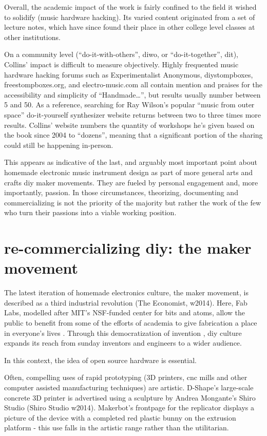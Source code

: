 \begin{itemize}
	Overall, the academic impact of the work is fairly confined to the field it wished to solidify (music hardware hacking). Its varied content originated from a set of lecture notes, which have since found their place in other college level classes at other institutions. 

On a community level (“do-it-with-others”, diwo, or “do-it-together”, dit), Collins’ impact is difficult to measure objectively. Highly frequented music hardware hacking forums such as Experimentalist Anonymous, diystompboxes, freestompboxes.org, and electro-music.com all contain mention and praises for the accessibility and simplicity of “Handmade…”, but results usually number between 5 and 50. As a reference, searching for Ray Wilson’s popular “music from outer space” do-it-yourself synthesizer website returns between two to three times more results. Collins’ website numbers the quantity of workshops he’s given based on the book since 2004 to “dozens”, meaning that a significant portion of the sharing could still be happening in-person.  

This appears as indicative of the last, and arguably most important point about homemade electronic music instrument design as part of more general arts and crafts \/ diy \/ maker movements. They are fueled by personal engagement and, more importantly, passion. In those circumstances, theorizing, documenting and commercializing is not the priority of the majority but rather the work of the few who turn their passions into a viable working position. 

\section{re-commercializing diy: the maker movement}  

The latest iteration of homemade electronics culture, the maker movement, is described as a third industrial revolution (The Economist, w2014). Here, Fab Labs, modelled after MIT’s NSF-funded center for bits and atoms, allow the public to benefit from some of the efforts of academia to give fabrication a place in everyone’s lives \citep{padfield2014,blikstein2013}. Through this democratization of invention \citep{blikstein2013}, diy culture expands its reach from sunday inventors and engineers to a wider audience. 

In this context, the idea of open source hardware is essential. 

	Often, compelling uses of rapid prototyping (3D printers, cnc mills and other computer assisted manufacturing techniques) are artistic. D-Shape’s large-scale concrete 3D printer is advertised using a sculpture by Andrea Mongante’s Shiro Studio (Shiro Studio w2014). Makerbot’s frontpage for the replicator displays a picture of the device with a completed red plastic bunny on the extrusion platform - this use falls in the artistic range rather than the utilitarian. 


\end{itemize}
